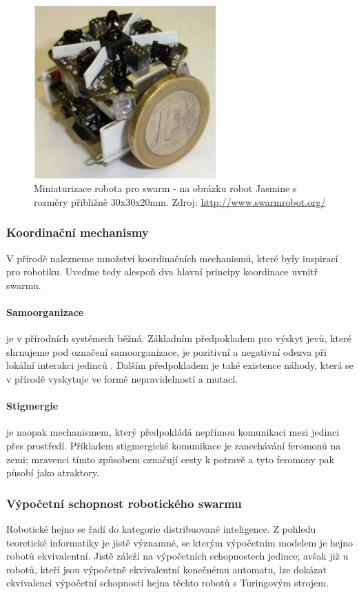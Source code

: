 \documentclass[a4paper,12pt]{article}
\begin{document}
\begin{figure}[here]
  \centering
  \includegraphics[width=7cm]{./img/jasmine.jpg}
  \caption{Miniaturizace robota pro swarm - na obrázku robot Jasmine s rozměry přibližně
    30x30x20mm. Zdroj: \url{http://www.swarmrobot.org/}}
  \label{fig:jasmine}
\end{figure}


\subsubsection{Koordinační mechanismy}
V přírodě nalezneme množství koordinačních mechanismů, které byly inspirací pro robotiku.
Uveďme tedy alespoň dva hlavní principy koordinace uvnitř swarmu.
\paragraph{Samoorganizace} {je v přírodních systémech běžná. Základním předpokladem pro
    výskyt jevů, které shrnujeme pod označení samoorganizace, je pozitivní a negativní
    odezva při lokální interakci jedinců \cite{Bonabeau99}. Dalším předpokladem je také
    existence náhody, která se v přírodě vyskytuje ve formě nepravidelností a mutací.}
\paragraph{Stigmergie} {je naopak mechanismem, který předpokládá nepřímou komunikaci
    mezi jedinci přes prostředí. Příkladem stigmergické komunikace je zanechávání feromonů
    na zemi; mravenci tímto způsobem označují cesty k potravě a tyto feromony pak působí
    jako atraktory.}

\subsubsection{Výpočetní schopnost robotického swarmu}
Robotické hejno se řadí do kategorie distribuované inteligence. Z pohledu teoretické
informatiky je jistě významné, se kterým výpočetním modelem je hejno robotů ekvivalentní.
Jistě záleží na výpočetních schopnostech jedince; avšak již u robotů, kteří jsou výpočetně
ekvivalentní konečnému automatu, lze dokázat ekvivalenci výpočetní schopnosti hejna těchto
robotů s Turingovým strojem.
\end{document}

